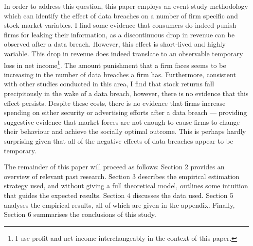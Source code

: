 \documentclass[../Main.tex]{subfiles}
\begin{document}
In order to address this question, this paper employs an event study methodology which can identify the effect of data breaches on a number of firm specific and stock market variables. I find some evidence that consumers do indeed punish firms for leaking their information, as a discontinuous drop in revenue can be observed after a data breach. However, this effect is short-lived and highly variable. This drop in revenue does indeed translate to an observable temporary loss in net income\footnote{I use profit and net income interchangeably in the context of this paper.}. The amount punishment that a firm faces seems to be increasing in the number of data breaches a firm has. Furthermore, consistent with other studies conducted in this area, I find that stock returns fall precipitously in the wake of a data breach, however, there is no evidence that this effect persists. Despite these costs, there is no evidence that firms increase spending on either security or advertising efforts after a data breach --- providing suggestive evidence that market forces are not enough to cause firms to change their behaviour and achieve the socially optimal outcome. This is perhaps hardly surprising given that all of the negative effects of data breaches appear to be temporary.

The remainder of this paper will proceed as follows: Section 2 provides an overview of relevant past research. Section 3 describes the empirical estimation strategy used, and without giving a full theoretical model, outlines some intuition that guides the expected results. Section 4 discusses the data used. Section 5 analyses the empirical results, all of which are given in the appendix. Finally, Section 6 summarises the conclusions of this study.

\biblio %
\end{document}
